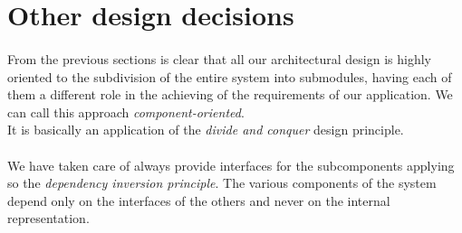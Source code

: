 \section{Other design decisions}
\paragraph{}From the previous sections is clear that all our architectural design is highly oriented to the subdivision of the entire system into submodules, having each of them a different role in the achieving of the requirements of our application. We can call this approach \textit{component-oriented}.\\
It is basically an application of the \textit{divide and conquer} design principle.
\paragraph{} We have taken care of always provide interfaces for the subcomponents applying so the \textit{dependency inversion principle}. The various components of the system depend only on the interfaces of the others and never on the internal representation.